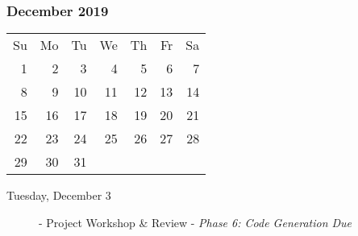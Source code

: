 \subsubsection*{December 2019}
\begin{tabular}{rrrrrrr}
Su & Mo & Tu & We & Th & Fr & Sa\\
 1 &  2 &  3 &  4 &  5 &  6 &  7\\
 8 &  9 & 10 & 11 & 12 & 13 & 14\\
15 & 16 & 17 & 18 & 19 & 20 & 21\\
22 & 23 & 24 & 25 & 26 & 27 & 28\\
29 & 30 & 31 &    &    &    &   \\
\end{tabular}
\begin{description}
\item[Tuesday, December 3]
    - Project Workshop \& Review
    \newline - {\em Phase 6: Code Generation Due}
\end{description}
